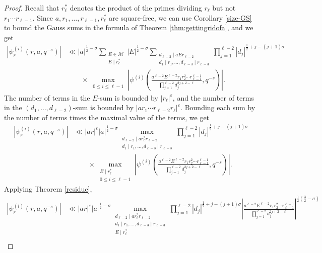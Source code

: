 \documentclass[12pt]{amsart}
\begin{document}
\begin{proof} Recall that $r_\ell^*$ denotes the product of the primes dividing $r_\ell$ but not $r_1\cdots r_{\ell-1}$. Since $a, r_1, \dots, r_{\ell-1}, r_\ell^*$ are square-free, we can use Corollary \ref{size-GS} to bound the Gauss sums in the formula of Theorem \ref{thm:gettingridofa}, and we get
\begin{align*}
|  \psi_r^{(i)}(r, a,q^{-s}) | &\ll |a|^{\frac12 - \sigma}
\sum_{\substack{E\in \mathcal{M}\\ E \mid r_\ell^* }}  |E|^{\frac12 - \sigma}
 \sum_{\substack{d_{\ell-2} \mid aEr_{\ell-2}\\ d_1\mid r_1, \dots, d_{\ell-3}\mid r_{\ell-3}}}
\prod_{j=1}^{\ell-2} |d_j|^{\frac12+j-(j+1) \sigma} \\
& \quad\quad \times \max_{\substack{0\leq i \leq \ell-1}} \left| \psi^{(i)} \left( \frac{a^{\ell-2} E^{\ell-2}r_1 r_2^2 \cdots r_{\ell-1}^{\ell-1}}{\prod_{j=1}^{\ell-2}d_j^{2j+2-\ell}}, q^{-s} \right) \right|.
\end{align*}
The number of terms in the $E$-sum is bounded by $|r_\ell|^\varepsilon$, and the number of terms in the $(d_1, \dots, d_{\ell-2})$-sum is bounded by $|a r_1 \cdots r_{\ell-2} r_\ell|^\varepsilon.$ Bounding each sum by the number of terms times the maximal value of the terms, we get
\begin{align*}
|  \psi_r^{(i)}(r, a,q^{-s}) | &\ll  |ar|^\varepsilon |a|^{\frac12 - \sigma}
 \max_{\substack{d_{\ell-2} \mid a r_\ell^* r_{\ell-2}\\ d_1\mid r_1, \dots, d_{\ell-3}\mid r_{\ell-3}}}
\prod_{j=1}^{\ell-2} |d_j|^{\frac12+j-(j+1) \sigma} \\
 & \quad \quad \times \max_{\substack{E \mid r_\ell^* \\0\leq i \leq \ell-1}} \left| \psi^{(i)} \left( \frac{a^{\ell-2}E^{\ell-2}r_1 r_2^2 \cdots r_{\ell-1}^{\ell-1}}{\prod_{j=1}^{\ell-2}d_j^{2j+2-\ell}}, q^{-s} \right) \right|.
 \end{align*}
Applying Theorem \ref{residue},
 \begin{align*}
 |  \psi_r^{(i)}(r, a,q^{-s}) | 
 &\ll  |ar|^\varepsilon |a|^{\frac12 - \sigma}
 \max_{\substack{d_{\ell-2} \mid a r_\ell^* r_{\ell-2}\\ d_1\mid r_1, \dots, d_{\ell-3}\mid r_{\ell-3}\\ E \mid r_\ell^*}}
 \prod_{j=1}^{\ell-2} |d_j|^{\frac12+j-(j+1) \sigma}  \left| \frac{a^{\ell-2}E^{\ell-2}r_1 r_2^2 \cdots r_{\ell-1}^{\ell-1}}{\prod_{j=1}^{\ell-2}d_j^{2j+2-\ell}} \right|^{\frac12 (\frac32 - \sigma)}\\

\end{align*}
\end{proof}
\end{document}
